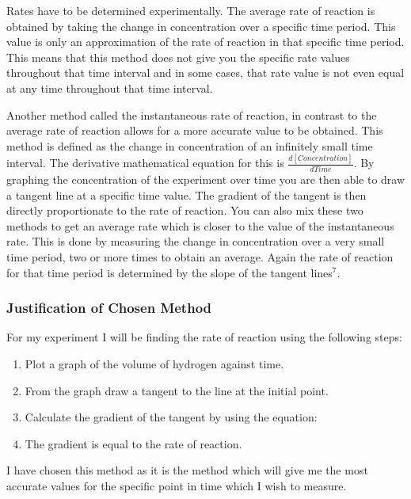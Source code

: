 Rates have to be determined experimentally. The average rate of reaction is obtained by taking the change in concentration over a specific time period. This value is only an approximation of the rate of reaction in that specific time period. This means that this method does not give you the specific rate values throughout that time interval and in some cases, that rate value is not even equal at any time throughout that time interval.

Another method called the instantaneous rate of reaction, in contrast to the average rate of reaction allows for a more accurate value to be obtained. This method is defined as the change in concentration of an infinitely small time interval. The derivative mathematical equation for this is $\frac{d[Concentration]}{dTime}$. By graphing the concentration of the experiment over time you are then able to draw a tangent line at a specific time value. The gradient of the tangent is then directly proportionate to the rate of reaction. You can also mix these two methods to get an average rate which is closer to the value of the instantaneous rate. This is done by measuring the change in concentration over a very small time period, two or more times to obtain an average. Again the rate of reaction for that time period is determined by the slope of the tangent lines$^7$.





		\subsubsection{Justification of Chosen Method}

For my experiment I will be finding the rate of reaction using the following steps:

\begin{enumerate}
\item Plot a graph of the volume of hydrogen against time.
\item From the graph draw a tangent to the line at the initial point.
\item Calculate the gradient of the tangent by using the equation: 
\item The gradient is equal to the rate of reaction.
\end{enumerate}

I have chosen this method as it is the method which will give me the most accurate values for the specific point in time which I wish to measure. 






